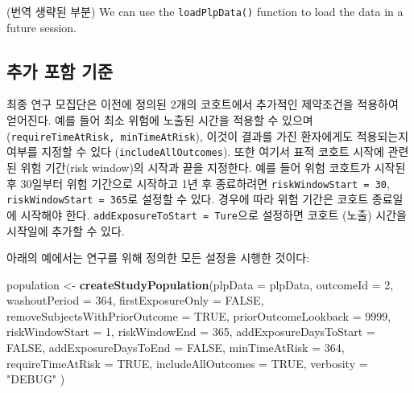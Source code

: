 \documentclass[11pt]{book}
\newenvironment{Shaded}{\begin{snugshade}}{\end{snugshade}}
\newcommand{\KeywordTok}[1]{\textcolor[rgb]{0.13,0.29,0.53}{\textbf{#1}}}
\newcommand{\DataTypeTok}[1]{\textcolor[rgb]{0.13,0.29,0.53}{#1}}
\newcommand{\DecValTok}[1]{\textcolor[rgb]{0.00,0.00,0.81}{#1}}
\newcommand{\StringTok}[1]{\textcolor[rgb]{0.31,0.60,0.02}{#1}}
\newcommand{\OtherTok}[1]{\textcolor[rgb]{0.56,0.35,0.01}{#1}}
\newcommand{\NormalTok}[1]{#1}
\theoremstyle{definition}
\theoremstyle{definition}
\theoremstyle{definition}
\theoremstyle{remark}
\begin{document}
(번역 생략된 부분) We can use the \texttt{loadPlpData()} function to
load the data in a future session.

\subsection{추가 포함 기준}\label{--}

최종 연구 모집단은 이전에 정의된 2개의 코호트에서 추가적인 제약조건을
적용하여 얻어진다. 예를 들어 최소 위험에 노출된 시간을 적용할 수 있으며
(\texttt{requireTimeAtRisk,\ minTimeAtRisk}), 이것이 결과를 가진
환자에게도 적용되는지 여부를 지정할 수 있다
(\texttt{includeAllOutcomes}). 또한 여기서 표적 코호트 시작에 관련된
위험 기간(risk window)의 시작과 끝을 지정한다. 예를 들어 위험 코호트가
시작된 후 30일부터 위험 기간으로 시작하고 1년 후 종료하려면
\texttt{riskWindowStart\ =\ 30}, \texttt{riskWindowStart\ =\ 365}로
설정할 수 있다. 경우에 따라 위험 기간은 코호트 종료일에 시작해야 한다.
\texttt{addExposureToStart\ =\ Ture}으로 설정하면 코호트 (노출) 시간을
시작일에 추가할 수 있다.

아래의 예에서는 연구를 위해 정의한 모든 설정을 시행한 것이다:

\begin{Shaded}
\begin{Highlighting}[]
\NormalTok{population <-}\StringTok{ }\KeywordTok{createStudyPopulation}\NormalTok{(}\DataTypeTok{plpData =}\NormalTok{ plpData,}
                                    \DataTypeTok{outcomeId =} \DecValTok{2}\NormalTok{,}
                                    \DataTypeTok{washoutPeriod =} \DecValTok{364}\NormalTok{,}
                                    \DataTypeTok{firstExposureOnly =} \OtherTok{FALSE}\NormalTok{,}
                                    \DataTypeTok{removeSubjectsWithPriorOutcome =} \OtherTok{TRUE}\NormalTok{,}
                                    \DataTypeTok{priorOutcomeLookback =} \DecValTok{9999}\NormalTok{,}
                                    \DataTypeTok{riskWindowStart =} \DecValTok{1}\NormalTok{,}
                                    \DataTypeTok{riskWindowEnd =} \DecValTok{365}\NormalTok{,}
                                    \DataTypeTok{addExposureDaysToStart =} \OtherTok{FALSE}\NormalTok{,}
                                    \DataTypeTok{addExposureDaysToEnd =} \OtherTok{FALSE}\NormalTok{,}
                                    \DataTypeTok{minTimeAtRisk =} \DecValTok{364}\NormalTok{,}
                                    \DataTypeTok{requireTimeAtRisk =} \OtherTok{TRUE}\NormalTok{,}
                                    \DataTypeTok{includeAllOutcomes =} \OtherTok{TRUE}\NormalTok{,}
                                    \DataTypeTok{verbosity =} \StringTok{"DEBUG"}
\NormalTok{)}
\end{Highlighting}
\end{Shaded}
\end{document}
